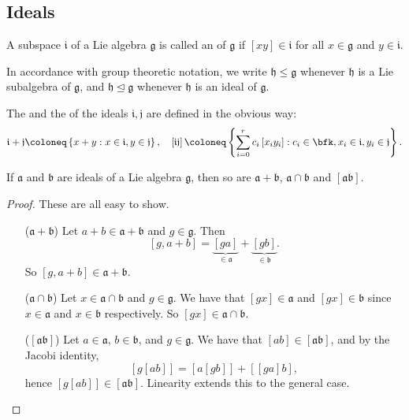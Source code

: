 \documentclass{article}
\newcommand*\tleq{\ensuremath{\mathrel{\unlhd}}}
\newcommand{\lb}[1]{\ensuremath{\left[{#1}\right]}}
\newcommand*\frka{{\ensuremath{\mathfrak{a}}}}
\newcommand*\frkb{{\ensuremath{\mathfrak{b}}}}
\newcommand*\frkg{{\ensuremath{\mathfrak{g}}}}
\newcommand*\frkh{{\ensuremath{\mathfrak{h}}}}
\newcommand*\frki{{\ensuremath{\mathfrak{i}}}}
\newcommand*\frkj{{\ensuremath{\mathfrak{j}}}}
\begin{document}
\subsection{Ideals}

\begin{definition}
    A subspace $\frki$ of a Lie algebra $\frkg$ is called an  of $\frkg$ if $\lb{xy} \in \frki$ for all $x \in \frkg$ and $y \in \frki$.
\end{definition}

\begin{convention}
    In accordance with group theoretic notation, we write $\frkh \leq \frkg$ whenever $\frkh$ is a Lie subalgebra of $\frkg$, and $\frkh \tleq \frkg$ whenever $\frkh$ is an ideal of $\frkg$.
\end{convention}

The  and the  of the ideals $\frki, \frkj$ are defined in the obvious way:
\[
    \frki + \frkj
    \coloneq
    \left\{
        x + y : x \in \frki, y \in \frkj
    \right\},\quad
    \lb{\frki\frkj}
    \coloneq
    \left\{
        \sum_{i=0}^rc_i\lb{x_iy_i}
        :
        c_i \in \bfk, x_i \in \frki, y_i \in \frkj
    \right\}.
\]

\begin{theorem}
    If $\frka$ and $\frkb$ are ideals of a Lie algebra $\frkg$, then so are $\frka + \frkb$, $\frka \cap \frkb$ and $\lb{\frka\frkb}$.
\end{theorem}
\begin{proof}
    These are all easy to show.
    \begin{itemize}
        \item[($\frka+\frkb$)]
            Let $a + b \in \frka + \frkb$ and $g \in \frkg$.
            Then
            \[
                \lb{g,a+b}
                =
                \underbrace{
                    \lb{ga}
                }_{\in \frka}
                +
                \underbrace{
                    \lb{gb}
                }_{\in \frkb}.
            \]
            So $\lb{g,a+b} \in \frka+\frkb$.
        \item[($\frka \cap \frkb$)]
            Let $x \in \frka \cap \frkb$ and $g \in \frkg$.
            We have that $\lb{gx} \in \frka$ and $\lb{gx} \in \frkb$ since $x \in \frka$ and $x \in \frkb$ respectively.
            So $\lb{gx} \in \frka \cap \frkb$.
        \item[($\lb{\frka\frkb}$)]
            Let $a \in \frka$, $b \in \frkb$, and $g \in \frkg$.
            We have that $\lb{ab} \in \lb{\frka\frkb}$, and by the Jacobi identity,
            \[
                \lb{g\lb{ab}}
                =
                \lb{a\lb{gb}}
                +
                \lb{\lb{ga}b},
            \]
            hence $\lb{g\lb{ab}} \in \lb{\frka\frkb}$.
            Linearity extends this to the general case.
    \end{itemize}
\end{proof}
\end{document}
